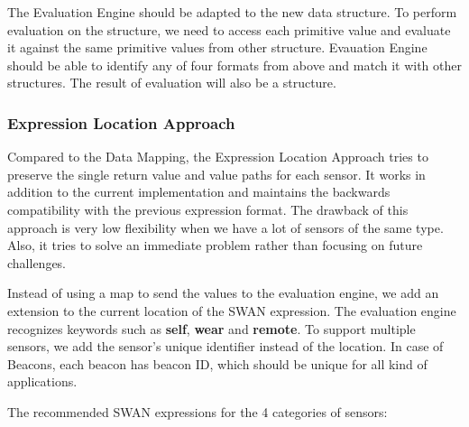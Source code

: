 The Evaluation Engine should be adapted to the new data structure. To perform evaluation on the structure,
we need to access each primitive value and evaluate it against the same primitive values from other structure.
Evauation Engine should be able to identify any of four formats from above and match it with other structures.
The result of evaluation will also be a structure.



\subsubsection{Expression Location Approach} \label{sssec:exprlocation}
Compared to the Data Mapping, the  Expression Location Approach tries to preserve the single return value and value paths for each sensor.
It works in addition to the current implementation and maintains the backwards compatibility with the previous expression format.
The drawback of this approach is very low flexibility when we have a lot of sensors of the same type. Also, it tries to solve an immediate 
problem rather than focusing on future challenges.

Instead of using a map to send the values to the evaluation engine, we add an extension to the current location of the SWAN expression.
The evaluation engine recognizes keywords such as \textbf{self}, \textbf{wear} and \textbf{remote}. To support multiple sensors, 
we add the sensor's unique identifier instead of the location. In case of Beacons, each beacon has beacon ID, which should be unique for 
all kind of applications.

The recommended SWAN expressions for the 4 categories of sensors:

